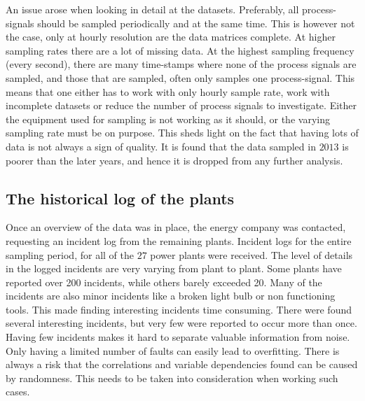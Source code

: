         
        
        An issue arose when looking in detail at the datasets. Preferably, all process-signals should be sampled periodically and at the same time. This is however not the case, only at hourly resolution are the data matrices complete. At higher sampling rates there are a lot of missing data. At the highest sampling frequency (every second), there are many time-stamps where none of the process signals are sampled, and those that are sampled, often only samples one process-signal. This means that one either has to work with only hourly sample rate, work with incomplete datasets or reduce the number of process signals to investigate. Either the equipment used for sampling is not working as it should, or the varying sampling rate must be on purpose. This sheds light on the fact that having lots of data is not always a sign of quality. It is found that the data sampled in $2013$ is poorer than the later years, and hence it is dropped from any further analysis. 
        
    \subsection{The historical log of the plants }
        Once an overview of the data was in place, the energy company was contacted, requesting an incident log from the remaining plants. Incident logs for the entire sampling period, for all of the $27$ power plants were received. The level of details in the logged incidents are very varying from plant to plant. Some plants have reported over 200 incidents, while others barely exceeded 20. Many of the incidents are also minor incidents like a broken light bulb or non functioning tools. This made finding interesting incidents time consuming. There were found several interesting incidents, but very few were reported to occur more than once. Having few incidents makes it hard to separate valuable information from noise. Only having a limited number of faults can easily lead to overfitting. There is always a risk that the correlations and variable dependencies found can be caused by randomness. This needs to be taken into consideration when working such cases.  
        
